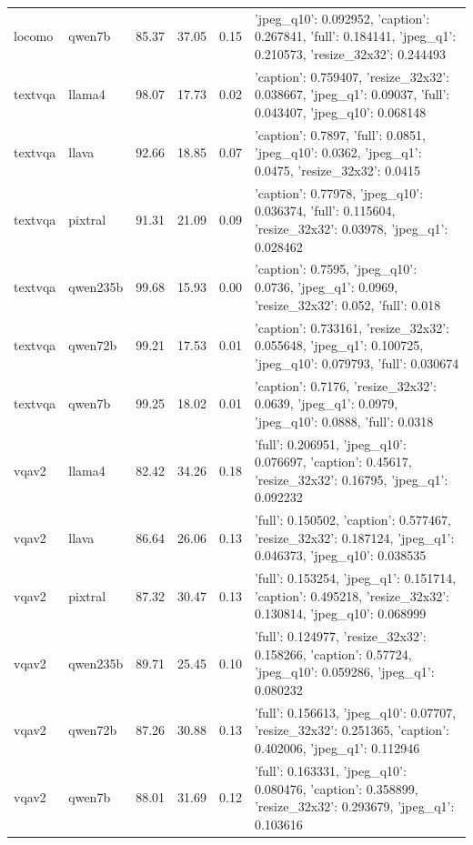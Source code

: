 \begin{tabular}{llrrrl}
locomo & qwen7b & 85.37 & 37.05 & 0.15 & {'jpeg_q10': 0.092952, 'caption': 0.267841, 'full': 0.184141, 'jpeg_q1': 0.210573, 'resize_32x32': 0.244493} \\
textvqa & llama4 & 98.07 & 17.73 & 0.02 & {'caption': 0.759407, 'resize_32x32': 0.038667, 'jpeg_q1': 0.09037, 'full': 0.043407, 'jpeg_q10': 0.068148} \\
textvqa & llava & 92.66 & 18.85 & 0.07 & {'caption': 0.7897, 'full': 0.0851, 'jpeg_q10': 0.0362, 'jpeg_q1': 0.0475, 'resize_32x32': 0.0415} \\
textvqa & pixtral & 91.31 & 21.09 & 0.09 & {'caption': 0.77978, 'jpeg_q10': 0.036374, 'full': 0.115604, 'resize_32x32': 0.03978, 'jpeg_q1': 0.028462} \\
textvqa & qwen235b & 99.68 & 15.93 & 0.00 & {'caption': 0.7595, 'jpeg_q10': 0.0736, 'jpeg_q1': 0.0969, 'resize_32x32': 0.052, 'full': 0.018} \\
textvqa & qwen72b & 99.21 & 17.53 & 0.01 & {'caption': 0.733161, 'resize_32x32': 0.055648, 'jpeg_q1': 0.100725, 'jpeg_q10': 0.079793, 'full': 0.030674} \\
textvqa & qwen7b & 99.25 & 18.02 & 0.01 & {'caption': 0.7176, 'resize_32x32': 0.0639, 'jpeg_q1': 0.0979, 'jpeg_q10': 0.0888, 'full': 0.0318} \\
vqav2 & llama4 & 82.42 & 34.26 & 0.18 & {'full': 0.206951, 'jpeg_q10': 0.076697, 'caption': 0.45617, 'resize_32x32': 0.16795, 'jpeg_q1': 0.092232} \\
vqav2 & llava & 86.64 & 26.06 & 0.13 & {'full': 0.150502, 'caption': 0.577467, 'resize_32x32': 0.187124, 'jpeg_q1': 0.046373, 'jpeg_q10': 0.038535} \\
vqav2 & pixtral & 87.32 & 30.47 & 0.13 & {'full': 0.153254, 'jpeg_q1': 0.151714, 'caption': 0.495218, 'resize_32x32': 0.130814, 'jpeg_q10': 0.068999} \\
vqav2 & qwen235b & 89.71 & 25.45 & 0.10 & {'full': 0.124977, 'resize_32x32': 0.158266, 'caption': 0.57724, 'jpeg_q10': 0.059286, 'jpeg_q1': 0.080232} \\
vqav2 & qwen72b & 87.26 & 30.88 & 0.13 & {'full': 0.156613, 'jpeg_q10': 0.07707, 'resize_32x32': 0.251365, 'caption': 0.402006, 'jpeg_q1': 0.112946} \\
vqav2 & qwen7b & 88.01 & 31.69 & 0.12 & {'full': 0.163331, 'jpeg_q10': 0.080476, 'caption': 0.358899, 'resize_32x32': 0.293679, 'jpeg_q1': 0.103616} \\
\bottomrule
\end{tabular}
